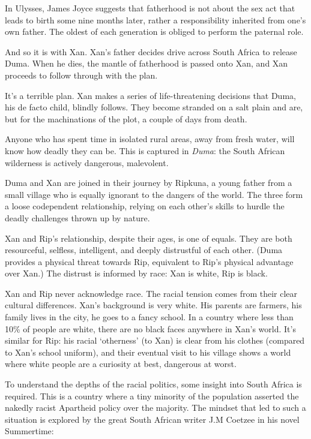In Ulysses, James Joyce suggests that fatherhood is not about the sex act that leads to birth some nine months later, rather a responsibility inherited from one's own father. The oldest of each generation is obliged to perform the paternal role.

And so it is with Xan. Xan's father decides drive across South Africa to release Duma. When he dies, the mantle of fatherhood is passed onto Xan, and Xan proceeds to follow through with the plan.

It's a terrible plan. Xan makes a series of life-threatening decisions that Duma, his de facto child, blindly follows. They become stranded on a salt plain and are, but for the machinations of the plot, a couple of days from death.

Anyone who has spent time in isolated rural areas, away from fresh water, will know how deadly they can be. This is captured in \textit{Duma}: the South African wilderness is actively dangerous, malevolent.

Duma and Xan are joined in their journey by Ripkuna, a young father from a small village who is equally ignorant to the dangers of the world. The three form a loose codependent relationship, relying on each other's skills to hurdle the deadly challenges thrown up by nature.

Xan and Rip's relationship, despite their ages, is one of equals. They are both resourceful, selfless, intelligent, and deeply distrustful of each other. (Duma provides a physical threat towards Rip, equivalent to Rip's physical advantage over Xan.) The distrust is informed by race: Xan is white, Rip is black.

Xan and Rip never acknowledge race. The racial tension comes from their clear cultural differences. Xan's background is very white. His parents are farmers, his family lives in the city, he goes to a fancy school. In a country where less than 10\% of people are white, there are no black faces anywhere in Xan's world. It's similar for Rip: his racial `otherness' (to Xan) is clear from his clothes (compared to Xan's school uniform), and their eventual visit to his village shows a world where white people are a curiosity at best, dangerous at worst.

To understand the depths of the racial politics, some insight into South Africa is required. This is a country where a tiny minority of the population asserted the nakedly racist Apartheid policy over the majority. The mindset that led to such a situation is explored by the great South African writer J.M Coetzee in his novel Summertime:

